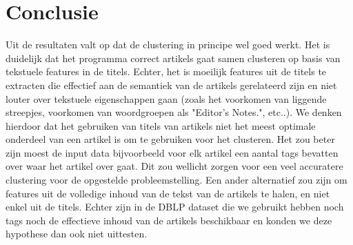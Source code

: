 \documentclass[11pt]{article}
\begin{document}
\section{Conclusie}
Uit de resultaten valt op dat de clustering in principe wel goed werkt. Het is duidelijk dat het programma correct artikels gaat samen clusteren op basis van tekstuele features in de titels. Echter, het is moeilijk features uit de titels te extracten die effectief aan de semantiek van de artikels gerelateerd zijn en niet louter over tekstuele eigenschappen gaan (zoals het voorkomen van liggende streepjes, voorkomen van woordgroepen als "Editor's Notes.", etc..). We denken hierdoor dat het gebruiken van titels van artikels niet het meest optimale onderdeel van een artikel is om te gebruiken voor het clusteren. Het zou beter zijn moest de input data bijvoorbeeld voor elk artikel een aantal tags bevatten over waar het artikel over gaat. Dit zou wellicht zorgen voor een veel accuratere clustering voor de opgestelde probleemstelling. Een ander alternatief zou zijn om features uit de volledige inhoud van de tekst van de artikels te halen, en niet enkel uit de titels. Echter zijn in de DBLP dataset die we gebruikt hebben noch tags noch de effectieve inhoud van de artikels beschikbaar en konden we deze hypothese dan ook niet uittesten. 
\end{document}
